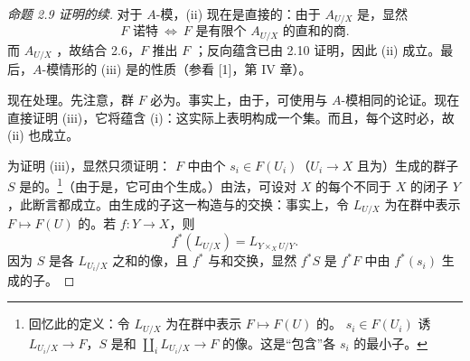 \begin{proof}[命题 2.9 证明的续]
对于 $A$-模，(ii) 现在是直接的：由于 $A_{U/X}$ 是，显然
\[
F\text{ 诺特}\ \Longleftrightarrow\ F\text{ 是有限个 }A_{U/X}\text{ 的直和的商}.
\]
而 $A_{U/X}$ ，故结合 2.6，$F$ 推出 $F$ ；反向蕴含已由 2.10 证明，因此 (ii) 成立。最后，$A$-模情形的 (iii) 是的性质（参看 [1]，第 IV 章）。

现在处理。先注意，群 $F$ 必为。事实上，由于，可使用与 $A$-模相同的论证。现在直接证明 (iii)，它将蕴含 (i)：这实际上表明构成一个集。而且，每个这时必，故 (ii) 也成立。

为证明 (iii)，显然只须证明： $F$ 中由个 $s_i\in F(U_i)$（$U_i\to X$ 且为）生成的群子 $S$ 是的。\footnote{回忆此的定义：令 $L_{U/X}$ 为在群中表示 $F\mapsto F(U)$ 的。 $s_i\in F(U_i)$ 诱 $L_{U_i/X}\to F$，$S$ 是和 $\coprod_iL_{U_i/X}\to F$ 的像。这是“包含”各 $s_i$ 的最小子。}（由于是，它可由个生成。）由法，可设对 $X$ 的每个不同于 $X$ 的闭子 $Y$，此断言都成立。由生成的子这一构造与的交换：事实上，令 $L_{U/X}$ 为在群中表示 $F\mapsto F(U)$ 的。若 $f:Y\to X$，则
\[
f^*(L_{U/X})=L_{Y\times_XU/Y}.
\]
因为 $S$ 是各 $L_{U_i/X}$ 之和的像，且 $f^*$ 与和交换，显然 $f^*S$ 是 $f^*F$ 中由 $f^*(s_i)$ 生成的子。


\end{proof}
